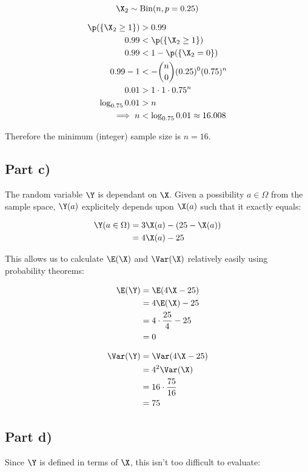 \[
\X_2 \sim \mathrm{Bin}(n, p = 0.25)
\]

\begin{align}
\p(\{\X_2 \geq 1\}) &> 0.99 \\
0.99 &< \p(\{ \X_2 \geq 1 \}) \\
0.99 &< 1 - \p(\{ \X_2 = 0 \}) \\
0.99 - 1 &< - {n \choose 0}(0.25)^0(0.75)^n \\
0.01 &> 1 \cdot 1 \cdot 0.75^n \\
\log _{0.75} 0.01 &> n \\
\implies n &< \log _{0.75} 0.01 \approx 16.008
\end{align}

Therefore the minimum (integer) sample size is $n = 16$.

\subsection{Part c)}

The random variable $\Y$ is dependant on $\X$.
Given a possibility $a \in \Omega$ from the sample space, $\Y(a)$ explicitely depends upon $\X(a)$ such that it exactly equals:

\begin{align}
\Y(a \in \Omega) &= 3\X(a) - (25 - \X(a)) \\
&= 4\X(a) - 25
\end{align}

This allows us to calculate $\E(\X)$ and $\Var(\X)$ relatively easily using probability theorems:

\begin{align}
\E(\Y) &= \E(4\X - 25) \\
&= 4\E(\X) - 25 \\
&= 4 \cdot \frac{25}{4} - 25 \\
&= 0
\end{align}

\begin{align}
\Var(\Y) &= \Var(4\X - 25) \\
&= 4^2 \Var(\X) \\
&= 16 \cdot \frac{75}{16} \\
&= 75
\end{align}

\subsection{Part d)}

Since $\Y$ is defined in terms of $\X$, this isn't too difficult to evaluate:

